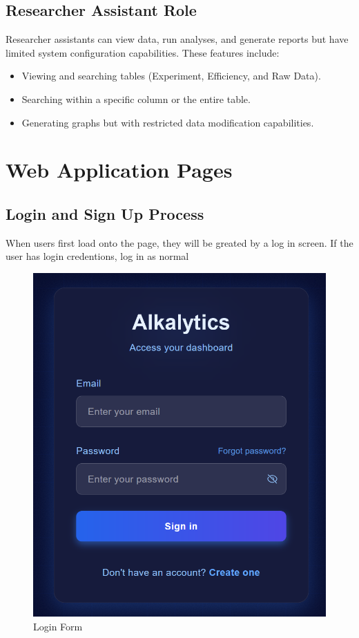 \documentclass[12pt]{article}
\begin{document}
\subsection{Researcher Assistant Role}
Researcher assistants can view data, run analyses, and generate reports but have limited
system configuration capabilities. \newline\newline
These features include:
\begin{itemize}
    \item Viewing and searching tables (Experiment, Efficiency, and Raw Data).
    \item Searching within a specific column or the entire table.
    \item Generating graphs but with restricted data modification capabilities.
\end{itemize}

\newpage
\section{Web Application Pages}

\subsection{Login and Sign Up Process}
When users first load onto the page, they will be greated by a log in screen. 
If the user has login credentions, log in as normal 
\begin{figure}[H]
    \centering
    \includegraphics[scale=0.55]{./Diagrams/login .png}
    \caption{Login Form}
    \label{fig:example}
\end{figure}
\end{document}
